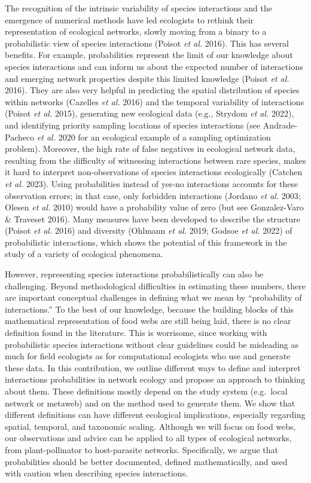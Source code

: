 \documentclass[10pt,oneside]{article}
\begin{document}
The recognition of the intrinsic variability of species interactions and
the emergence of numerical methods have led ecologists to rethink their
representation of ecological networks, slowly moving from a binary to a
probabilistic view of species interactions (Poisot \emph{et al.} 2016).
This has several benefits. For example, probabilities represent the
limit of our knowledge about species interactions and can inform us
about the expected number of interactions and emerging network
properties despite this limited knowledge (Poisot \emph{et al.} 2016).
They are also very helpful in predicting the spatial distribution of
species within networks (Cazelles \emph{et al.} 2016) and the temporal
variability of interactions (Poisot \emph{et al.} 2015), generating new
ecological data (e.g., Strydom \emph{et al.} 2022), and identifying
priority sampling locations of species interactions (see Andrade-Pacheco
\emph{et al.} 2020 for an ecological example of a sampling optimization
problem). Moreover, the high rate of false negatives in ecological
network data, resulting from the difficulty of witnessing interactions
between rare species, makes it hard to interpret non-observations of
species interactions ecologically (Catchen \emph{et al.} 2023). Using
probabilities instead of yes-no interactions accounts for these
observation errors; in that case, only forbidden interactions (Jordano
\emph{et al.} 2003; Olesen \emph{et al.} 2010) would have a probability
value of zero (but see Gonzalez-Varo \& Traveset 2016). Many measures
have been developed to describe the structure (Poisot \emph{et al.}
2016) and diversity (Ohlmann \emph{et al.} 2019; Godsoe \emph{et al.}
2022) of probabilistic interactions, which shows the potential of this
framework in the study of a variety of ecological phenomena.

However, representing species interactions probabilistically can also be
challenging. Beyond methodological difficulties in estimating these
numbers, there are important conceptual challenges in defining what we
mean by ``probability of interactions.'' To the best of our knowledge,
because the building blocks of this mathematical representation of food
webs are still being laid, there is no clear definition found in the
literature. This is worrisome, since working with probabilistic species
interactions without clear guidelines could be misleading as much for
field ecologists as for computational ecologists who use and generate
these data. In this contribution, we outline different ways to define
and interpret interactions probabilities in network ecology and propose
an approach to thinking about them. These definitions mostly depend on
the study system (e.g.~local network or metaweb) and on the method used
to generate them. We show that different definitions can have different
ecological implications, especially regarding spatial, temporal, and
taxonomic scaling. Although we will focus on food webs, our observations
and advice can be applied to all types of ecological networks, from
plant-pollinator to host-parasite networks. Specifically, we argue that
probabilities should be better documented, defined mathematically, and
used with caution when describing species interactions.
\end{document}
